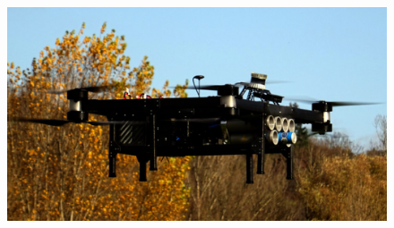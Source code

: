 \documentclass[aspectratio=169]{beamer}
\begin{document}
\begin{frame}
\begin{columns}[c]
    \vspace{-1em}

    \begin{figure}
      \centering
      \includegraphics[width=1.0\textwidth]{./fig/uavs/dofec_real.jpg}
    \end{figure}

  \end{columns}

\end{frame}


\end{document}
